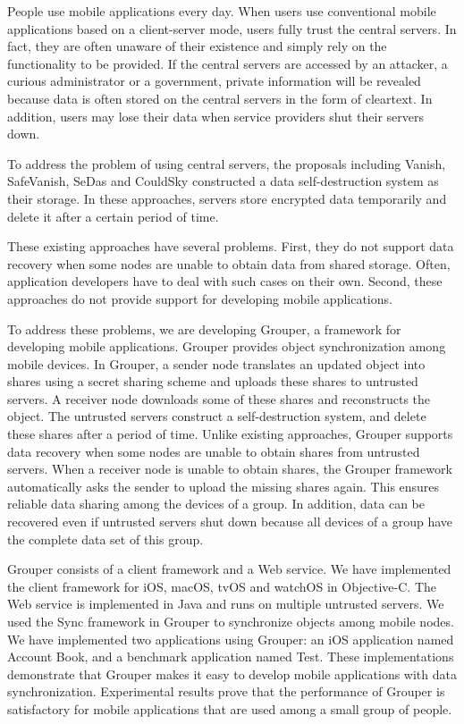 \documentclass[sigconf]{acmart}
\begin{document}
People use mobile applications every day. 
When users use conventional mobile applications based on a client-server mode, users fully trust the central servers.
In fact, they are often unaware of their existence and simply rely on the functionality to be provided.
If the central servers are accessed by an attacker, a curious administrator or a government, private information will be revealed because data is often stored on the central servers in the form of cleartext.
In addition, users may lose their data when service providers shut their servers down.

To address the problem of using central servers, the proposals including Vanish\cite{geambasu2009vanish}, SafeVanish\cite{zeng2010safevanish}, SeDas\cite{zeng2012sedas} and CouldSky\cite{zeng2015cloudsky} constructed a data self-destruction system as their storage.
In these approaches, servers store encrypted data temporarily and delete it after a certain period of time.

These existing approaches have several problems.
First, they do not support data recovery when some nodes are unable to obtain data from shared storage.
Often, application developers have to deal with such cases on their own.
Second, these approaches do not provide support for developing mobile applications.

To address these problems, we are developing Grouper, a framework for developing mobile applications. 
Grouper provides object synchronization among mobile devices.
In Grouper, a sender node translates an updated object into shares using a secret sharing scheme and uploads these shares to untrusted servers. 
A receiver node downloads some of these shares and reconstructs the object.
The untrusted servers construct a self-destruction system, and delete these shares after a period of time.
Unlike existing approaches, Grouper supports data recovery when some nodes are unable to obtain shares from untrusted servers.
When a receiver node is unable to obtain shares, the Grouper framework automatically asks the sender to upload the missing shares again.
This ensures reliable data sharing among the devices of a group.
In addition, data can be recovered even if untrusted servers shut down because all devices of a group have the complete data set of this group.

Grouper consists of a client framework and a Web service.
We have implemented the client framework for iOS, macOS, tvOS and watchOS in Objective-C.
The Web service is implemented in Java and runs on multiple untrusted servers.
We used the Sync\cite{sync} framework in Grouper to synchronize objects among mobile nodes.
We have implemented two applications using Grouper: an iOS application named Account Book, and a benchmark application named Test.
These implementations demonstrate that Grouper makes it easy to develop mobile applications with data synchronization.
Experimental results prove that the performance of Grouper is satisfactory for mobile applications that are used among a small group of people.
\end{document}
